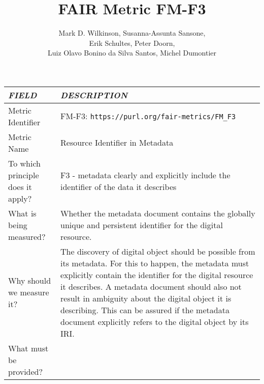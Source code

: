 \documentclass[english]{article}
\begin{document}
\title{FAIR Metric FM-F3}

\author{Mark D. Wilkinson, Susanna-Assunta Sansone, \\Erik Schultes, Peter Doorn,\\ 
Luiz Olavo Bonino da Silva Santos, Michel Dumontier}

\maketitle

\newpage





\begin{longtable}{|p{5cm}|p{9cm}|}


\hline
\emph{FIELD} & \emph{DESCRIPTION} \\
\hline
Metric Identifier &   FM-F3: \verb"https://purl.org/fair-metrics/FM_F3"
 \\


\hline
Metric Name &   

Resource Identifier in Metadata


 \\



\hline
To which principle does it apply? &   
F3 - metadata clearly and explicitly include the identifier of the data it describes
\\



\hline
What is being measured? & 


Whether the metadata document contains the globally unique and persistent identifier for the digital resource.

\\



\hline
Why should we measure it? & 



The discovery of digital object should be possible from its metadata. For this to happen, the metadata must explicitly contain the identifier for the digital resource it describes. 
A metadata document should also not result in ambiguity about the digital object it is describing. This can be assured if the metadata document explicitly refers to the digital object by its IRI.

  
\\



\hline
What must be provided? &  



\end{longtable}
\end{document}
